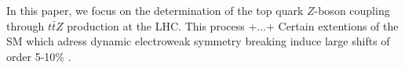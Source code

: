 \documentclass[preprint]{JHEP3} %
\def\ttbZ{t\bar{t}Z}
\def\ttb{t\bar{t}}
\begin{document}


In this paper, we focus on the determination of the top quark $Z$-boson coupling through $\ttbZ$ production at the LHC. This process +...+
Certain extentions of the SM which adress dynamic electroweak symmetry breaking induce large shifts of order 5-10\% \cite{?}.
% 
\end{document}
